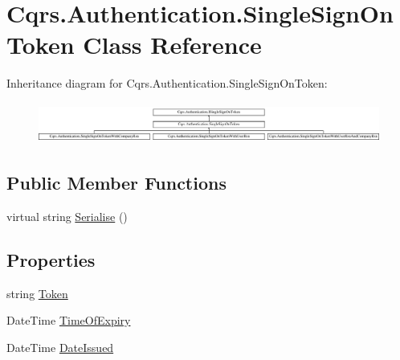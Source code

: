 \hypertarget{classCqrs_1_1Authentication_1_1SingleSignOnToken}{}\section{Cqrs.\+Authentication.\+Single\+Sign\+On\+Token Class Reference}
\label{classCqrs_1_1Authentication_1_1SingleSignOnToken}
Inheritance diagram for Cqrs.\+Authentication.\+Single\+Sign\+On\+Token\+:\begin{figure}[H]
\begin{center}
\leavevmode
\includegraphics[height=1.355932cm]{classCqrs_1_1Authentication_1_1SingleSignOnToken}
\end{center}
\end{figure}
\subsection*{Public Member Functions}
\begin{DoxyCompactItemize}
\item 
virtual string \hyperlink{classCqrs_1_1Authentication_1_1SingleSignOnToken_a5e859c6c5db5aaa9ef4e8f2086df4604_a5e859c6c5db5aaa9ef4e8f2086df4604}{Serialise} ()
\end{DoxyCompactItemize}
\subsection*{Properties}
\begin{DoxyCompactItemize}
\item 
string \hyperlink{classCqrs_1_1Authentication_1_1SingleSignOnToken_a7a704dd5d4f396e5c0b413b4b39e7406_a7a704dd5d4f396e5c0b413b4b39e7406}{Token}
\item 
Date\+Time \hyperlink{classCqrs_1_1Authentication_1_1SingleSignOnToken_a3e9a9ee37ec53edd665e4e8d46f73f85_a3e9a9ee37ec53edd665e4e8d46f73f85}{Time\+Of\+Expiry}
\item 
Date\+Time \hyperlink{classCqrs_1_1Authentication_1_1SingleSignOnToken_aa0ea2d0654dd2aab23af98806663cd7c_aa0ea2d0654dd2aab23af98806663cd7c}{Date\+Issued}
\end{DoxyCompactItemize}


